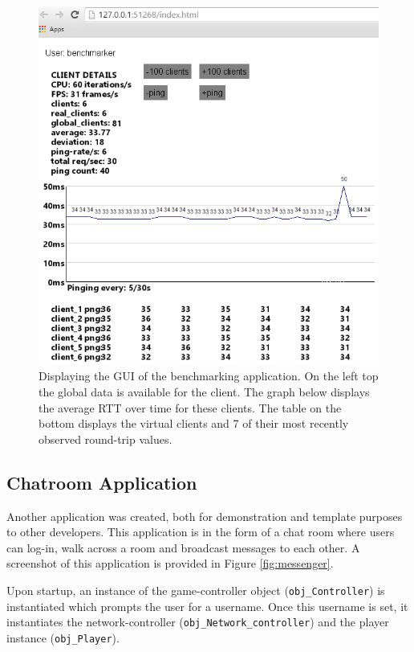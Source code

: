 \documentclass[bsc, 12pt, twoside, singlespacing, parskip, abbrevs, notimes, normalheadings, logo, deptreport]{styles/infthesis}
\begin{document}
\begin{figure}[H]
\centering
\includegraphics[scale=0.62]{images/benchmarker2.jpg}
\caption{Displaying the GUI of the benchmarking application. On the left top the global data is available for the client. The graph below displays the average RTT over time for these clients. The table on the bottom displays the virtual clients and 7 of their most recently observed round-trip values.}
\label{fig:benchmark_gui}
\end{figure}



\subsection{Chatroom Application}
Another application was created, both for demonstration and template purposes to other developers. This application is in the form of a chat room where users can log-in, walk across a room and broadcast messages to each other. A screenshot of this application is provided in Figure \ref{fig:messenger}.

Upon startup, an instance of the game-controller object (\texttt{obj\_Controller}) is instantiated which prompts the user for a username. Once this username is set, it instantiates the network-controller (\texttt{obj\_Network\_controller}) and the player instance (\texttt{obj\_Player}).
\end{document}
